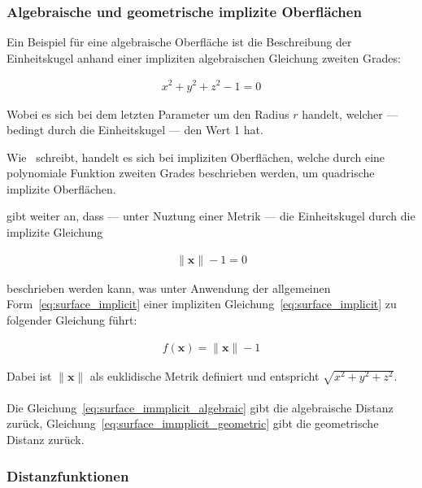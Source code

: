 \subsubsection{Algebraische und geometrische implizite Oberflächen}
\label{ssubsec:implicit_surfaces_algebraic_geometric}

Ein Beispiel für eine algebraische Oberfläche ist die Beschreibung der
Einheitskugel anhand einer impliziten algebraischen Gleichung zweiten Grades:

\begin{gather} \label{eq:surface_immplicit_algebraic}
    x^{2} + y^{2} + z^{2} - 1 = 0
\end{gather}

Wobei es sich bei dem letzten Parameter um den Radius $r$ handelt, welcher ---
bedingt durch die Einheitskugel --- den Wert 1 hat.

Wie~\cite{division_introduction_1996} schreibt, handelt es sich bei impliziten
Oberflächen, welche durch eine polynomiale Funktion zweiten Grades beschrieben
werden, um quadrische implizite Oberflächen.

\cite{hart_sphere_1994} gibt weiter an, dass --- unter Nuztung einer Metrik ---
die Einheitskugel durch die implizite Gleichung

\begin{gather} \label{eq:surface_immplicit_geometric}
    \|\bm{x}\| - 1 = 0
\end{gather}

beschrieben werden kann, was unter Anwendung der allgemeinen
Form~\ref{eq:surface_implicit} einer impliziten
Gleichung~\ref{eq:surface_implicit} zu folgender Gleichung führt:

\begin{gather}
    f(\bm{x}) = \|\bm{x}\| - 1
\end{gather}

Dabei ist $\|\bm{x}\|$ als euklidische Metrik definiert und entspricht $\sqrt{x^{2} + y^{2} + z^{2}}$.\\
\\
Die Gleichung~\ref{eq:surface_immplicit_algebraic} gibt die algebraische
Distanz zurück, Gleichung~\ref{eq:surface_immplicit_geometric} gibt die
geometrische Distanz zurück.\\

\subsubsection{Distanzfunktionen}
\label{ssubsec:distance_functions}

